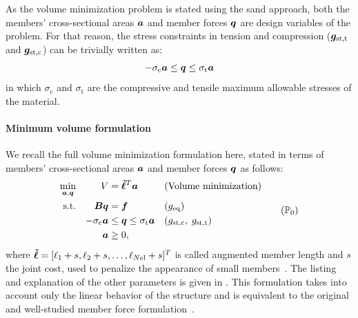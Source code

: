 As the volume minimization problem is stated using the \gls{sand} approach, both the members' cross-sectional areas $\bm{a}$ and member forces $\bm{q}$ are design variables of the problem. For that reason, the stress constraints in tension and compression ($\bm{g}_\text{st,t}$ and $\bm{g}_\text{st,c}$) can be trivially written as:
\begin{equation}
    -\sigma_\text{c}\bm{a} \leq \bm{q} \leq \sigma_\text{t}\bm{a}
\end{equation}
in which $\sigma_\text{c}$ and $\sigma_\text{t}$ are the compressive and tensile maximum allowable stresses of the material.

\paragraph{Minimum volume formulation}
We recall the full volume minimization formulation here, stated in terms of members' cross-sectional areas $\bm{a}$ and member forces $\bm{q}$ as follows:
\begin{equation}
    \begin{aligned}
    \min_{\vect{a}, \vect{q}}   && V &= \vect{\tilde{\ell}}^{T}\vect{a} && \textrm{(Volume minimization)}\\
    \textrm{s.t.}   && \matr{B}\vect{q} &= \vect{f} && (g_\text{eq})\\
    && -\sigma_\text{c}\vect{a} &\leq \vect{q} \leq \sigma_\text{t}\vect{a} && (g_\text{st,c}, \; g_\text{st,t}) \\
    && \vect{a} &\geq 0, \\
    \end{aligned}
    \tag{$\mathbb{P}_0$}
    \label{eq:03_optim_original}
\end{equation}
where $\bm{\tilde{\ell}} = [\ell_1 + s, \ell_2 + s, \ldots,\ell_{N\text{el}} + s]^T$ is called augmented member length and $s$ the joint cost, used to penalize the appearance of small members~. The listing and explanation of the other parameters is given in . This formulation takes into account only the linear behavior of the structure and is equivalent to the original and well-studied member force formulation~. 

